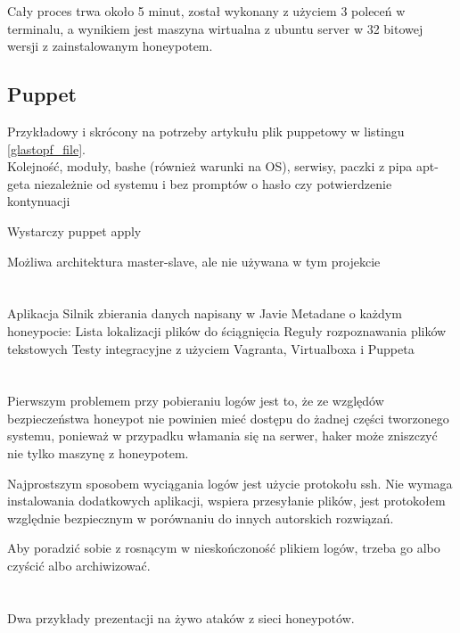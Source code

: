 \documentclass[runningheads,a4paper]{llncs}
\begin{document}
Cały proces trwa około 5 minut, został wykonany z użyciem 3 poleceń w terminalu, a wynikiem jest maszyna wirtualna z ubuntu server w 32 bitowej wersji z zainstalowanym honeypotem.

\subsection*{Puppet}

Przykładowy i skrócony na potrzeby artykułu plik puppetowy w listingu \ref{glastopf_file}.
\\


Kolejność, moduły, bashe (również warunki na OS), serwisy, paczki z pipa apt-geta niezależnie od systemu i bez promptów o hasło czy potwierdzenie kontynuacji

Wystarczy puppet apply

Możliwa architektura master-slave, ale nie używana w tym projekcie

\section{}
Aplikacja
Silnik zbierania danych napisany w Javie
Metadane o każdym honeypocie:
Lista lokalizacji plików do ściągnięcia
Reguły rozpoznawania plików tekstowych
Testy integracyjne z użyciem Vagranta, Virtualboxa i Puppeta
\section{}
Pierwszym problemem przy pobieraniu logów jest to, że ze względów bezpieczeństwa honeypot nie powinien mieć dostępu do żadnej części tworzonego systemu, ponieważ w przypadku włamania się na serwer, haker może zniszczyć nie tylko maszynę z honeypotem.

Najprostszym sposobem wyciągania logów jest użycie protokołu ssh. Nie wymaga instalowania dodatkowych aplikacji, wspiera przesyłanie plików, jest protokołem względnie bezpiecznym w porównaniu do innych autorskich rozwiązań.

Aby poradzić sobie z rosnącym w nieskończoność plikiem logów, trzeba go albo czyścić albo archiwizować.

\section{}
Dwa przykłady prezentacji na żywo ataków z sieci honeypotów.
\end{document}
